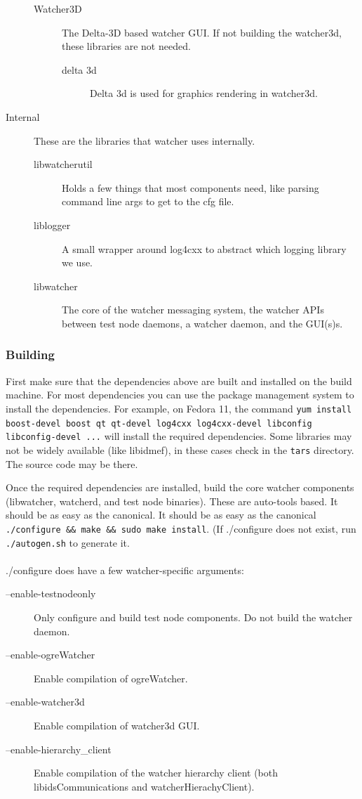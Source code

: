 \documentclass{article}
\begin{document}
\begin{description}
\begin{description}
\item[Watcher3D] The Delta-3D based watcher GUI. If not building the watcher3d, these libraries are not needed. 
\begin{description}
\item[delta 3d] Delta 3d is used for graphics rendering in watcher3d. 
\end{description}
\end{description}
\item[Internal] These are the libraries that watcher uses internally. 
\begin{description}
\item[libwatcherutil] Holds a few things that most components need, like parsing command line args to get to the cfg file.
\item[liblogger] A small wrapper around log4cxx to abstract which logging library we use. 
\item[libwatcher] The core of the watcher messaging system, the watcher APIs between test node daemons, a watcher daemon, and the GUI(s)s.
\end{description}
\end{description}

\subsubsection{Building}

First make sure that the dependencies above are built and installed on the build machine. For most dependencies you can use the package management system to install 
the dependencies. For example, on Fedora 11, the command {\tt yum install boost-devel boost qt qt-devel log4cxx log4cxx-devel libconfig libconfig-devel ...} will install the 
required dependencies. Some libraries may not be widely available (like libidmef), in these cases check in the {\tt tars} directory. The source code may be there. 

Once the required dependencies are installed, build the core watcher components (libwatcher, watcherd, and test node binaries). These are auto-tools based. It should be as easy 
as the canonical. It should be as easy as the canonical {\tt .\slash configure \&\& make \&\& sudo make install}. (If .\slash configure does not exist, run {\tt .\slash autogen.sh} to generate it. 
\\\\
.\slash configure does have a few watcher-specific arguments:
\begin{description}
\item[--enable-testnodeonly]   Only configure and build test node components. Do not build the watcher daemon.
\item[--enable-ogreWatcher]    Enable compilation of ogreWatcher.
\item[--enable-watcher3d]      Enable compilation of watcher3d GUI.
\item[--enable-hierarchy\_client] Enable compilation of the watcher hierarchy client (both libidsCommunications and watcherHierachyClient). 
\end{description}
\end{document}
